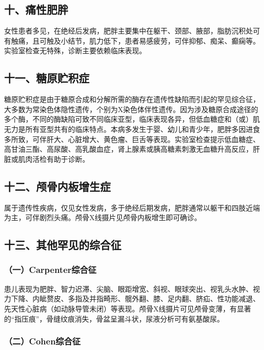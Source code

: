 \subsection{十、痛性肥胖}

女性患者多见，在绝经后发病，肥胖主要集中在躯干、颈部、腋部，脂肪沉积处可有触痛，且可触及小结节，肌力低下，患者易感疲劳，可伴抑郁、痴呆、癫痫等。实验室检查无特殊，诊断主要依赖临床表现。

\subsection{十一、糖原贮积症}

糖原贮积症是由于糖原合成和分解所需的酶存在遗传性缺陷而引起的罕见综合征，大多数为常染色体隐性遗传，个别为X染色体伴性遗传。因为涉及糖原合成途径的多个酶，不同的酶缺陷可致不同临床亚型，临床表现各异，但低血糖症和（或）肌无力是所有亚型共有的临床特点。本病多发生于婴、幼儿和青少年，肥胖多因进食多所致，可伴肝大、心脏增大、黄色瘤、巨舌等表现。实验室检查提示低血糖症、高甘油三酯、高尿酸、高乳酸血症，肾上腺素或胰高糖素刺激无血糖升高反应，肝脏或肌肉活检有助于诊断。

\subsection{十二、颅骨内板增生症}

属于遗传性疾病，仅见女性发病，多于绝经后期发病，肥胖通常以躯干和四肢近端为主，可伴剧烈头痛。颅骨X线摄片见颅骨内板增生即可确诊。

\subsection{十三、其他罕见的综合征}

\subsubsection{（一）Carpenter综合征}

患儿表现为肥胖、智力迟滞、尖脑、眼距增宽、斜视、眼球突出、视乳头水肿、视力下降、内眦赘皮、多指及并指畸形、髋外翻、膝、足内翻、脐疝、性功能减退、先天性心脏病（如动脉导管未闭）等表现。颅骨X线摄片可见颅骨变薄，有显著的“指压痕”，骨缝纹痕消失，骨盆呈漏斗状，尿液分析可有氨基酸尿。

\subsubsection{（二）Cohen综合征}

